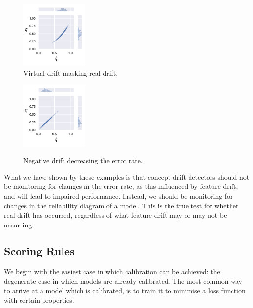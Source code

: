 \begin{figure}
    \centering
        \includegraphics[width=0.3\textwidth]{images/hidden_drift.pdf}
    \caption{Virtual drift masking real drift.}
    \label{fig:co_drift}
\end{figure}

\begin{figure}
    \centering
    \includegraphics[width=0.3\textwidth]{images/positive_virtual.pdf}
    \label{fig:pos_virt}
    \caption{Negative drift decreasing the error rate.}
\end{figure}

What we have shown by these examples is that concept drift detectors should not be monitoring for changes in the error rate, as this influenced by feature drift, and will lead to impaired performance. Instead, we should be monitoring for changes in the reliability diagram of a model. This is the true test for whether real drift has occurred, regardless of what feature drift may or may not be occurring.

\subsection{Scoring Rules}

We begin with the easiest case in which calibration can be achieved: the degenerate case in which models are already calibrated. The most common way to arrive at a model which is calibrated, is to train it to minimise a loss function with certain properties. 

